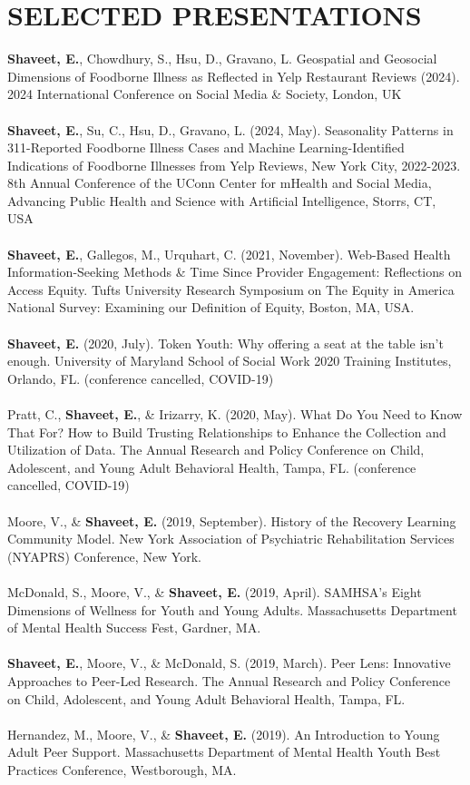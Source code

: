\documentclass[a4paper,12pt]{article}
\begin{document}
{\section*{SELECTED PRESENTATIONS}
\textbf{Shaveet, E.}, Chowdhury, S., Hsu, D., Gravano, L. Geospatial and Geosocial Dimensions of Foodborne Illness as Reflected in Yelp Restaurant Reviews (2024). 2024 International Conference on Social Media \& Society, London, UK\\
\\
\textbf{Shaveet, E.}, Su, C., Hsu, D., Gravano, L. (2024, May). Seasonality Patterns in 311-Reported Foodborne Illness Cases and Machine Learning-Identified Indications of Foodborne Illnesses from Yelp Reviews, New York City, 2022-2023. 8th Annual Conference of the UConn Center for mHealth and Social Media, Advancing Public Health and Science with Artificial Intelligence, Storrs, CT, USA\\
\\
\textbf{Shaveet, E.}, Gallegos, M., Urquhart, C. (2021, November). Web-Based Health Information-Seeking Methods \& Time Since Provider Engagement: Reflections on Access Equity. Tufts University Research Symposium on The Equity in America National Survey: Examining our Definition of Equity, Boston, MA, USA.\\
\\
\textbf{Shaveet, E.} (2020, July). Token Youth: Why offering a seat at the table isn’t enough. University of Maryland School of Social Work 2020 Training Institutes, Orlando, FL. (conference cancelled, COVID-19)\\
\\
Pratt, C., \textbf{Shaveet, E.}, \& Irizarry, K. (2020, May). What Do You Need to Know That For? How to Build Trusting Relationships to Enhance the Collection and Utilization of Data. The Annual Research and Policy Conference on Child, Adolescent, and Young Adult Behavioral Health, Tampa, FL. (conference cancelled, COVID-19)\\
\\
Moore, V., \& \textbf{Shaveet, E.} (2019, September). History of the Recovery Learning Community Model. New York Association of Psychiatric Rehabilitation Services (NYAPRS) Conference, New York.\\
\\
McDonald, S., Moore, V., \& \textbf{Shaveet, E.} (2019, April). SAMHSA’s Eight Dimensions of Wellness for Youth and Young Adults. Massachusetts Department of Mental Health Success Fest, Gardner, MA.\\
\\
\textbf{Shaveet, E.}, Moore, V., \& McDonald, S. (2019, March). Peer Lens: Innovative Approaches to Peer-Led Research. The Annual Research and Policy Conference on Child, Adolescent, and Young Adult Behavioral Health, Tampa, FL.\\
\\
Hernandez, M., Moore, V., \& \textbf{Shaveet, E.} (2019). An Introduction to Young Adult Peer Support. Massachusetts Department of Mental Health Youth Best Practices Conference, Westborough, MA.

}
\end{document}
